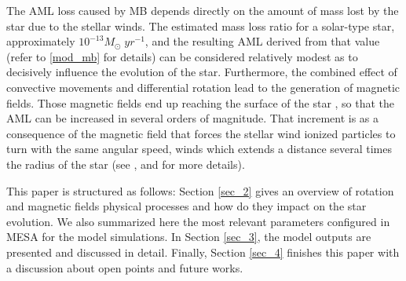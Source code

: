 \documentclass[fleqn,usenatbib]{mnras}
\begin{document}
The AML loss caused by MB depends directly on the amount of mass lost by the star due to the stellar winds. The estimated mass loss ratio for a solar-type star, approximately $10^{-13}M_{\odot} \; yr^{-1}$, and the resulting AML derived from that value (refer to \ref{mod_mb} for details) can be considered relatively modest as to decisively influence the evolution of the star. Furthermore, the combined effect of convective movements and differential rotation lead to the generation of magnetic fields. Those magnetic fields end up reaching the surface of the star \citep{Langer2012}, so that the AML can be increased in several orders of magnitude. That increment is as a consequence of the magnetic field that forces the stellar wind ionized particles to turn with the same angular speed, winds which extends a distance several times the radius of the star (see \citet{UdDoula2002}, \citet{Ud-Doula2007} and \citet{Ud-Doula2008} for more details).

This paper is structured as follows: Section \ref{sec_2} gives an overview of rotation and magnetic fields physical processes and how do they impact on the star evolution. We also summarized here the most relevant parameters configured in MESA for the model simulations. In Section \ref{sec_3}, the model outputs are presented and discussed in detail. Finally, Section \ref{sec_4} finishes this paper with a discussion about open points and future works.\par
\end{document}
